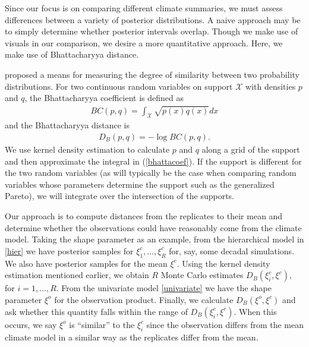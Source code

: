 Since our focus is on comparing different climate summaries, we must assess differences between a variety of posterior distributions. A naive approach may be to simply determine whether posterior intervals overlap. Though we make use of visuals in our comparison, we desire a more quantitative approach. Here, we make use of Bhattacharyya distance.

\cite{bhattacharyya1943measure} proposed a means for measuring the degree of similarity between two probability distributions. For two continuous random variables on support $\mathcal{X}$ with densities $p$ and $q$, the Bhattacharyya coefficient is defined as
\begin{align}
BC(p,q)=\int_\mathcal{X} \sqrt{p(x)q(x)} dx \label{bhattacoef}
\end{align}
and the Bhattacharyya distance is 
\begin{align}
D_B(p,q)=-\log BC(p,q).
\end{align}
We use kernel density estimation to calculate $p$ and $q$ along a grid of the support and then approximate the integral in (\ref{bhattacoef}). If the support is different for the two random variables (as will typically be the case when comparing random variables whose parameters determine the support such as the generalized Pareto), we will integrate over the intersection of the supports.

Our approach is to compute distances from the replicates to their mean and determine whether the observations could have reasonably come from the climate model. Taking the shape parameter as an example, from the hierarchical model in \ref{hier} we have posterior samples for $\xi_1^c,\ldots,\xi_R^c$ for, say, some decadal simulations. We also have posterior samples for the mean $\xi^c$. Using the kernel density estimation mentioned earlier, we obtain $R$ Monte Carlo estimates $D_B(\xi_i^c, \xi^c)$, for $i=1,\ldots,R$. From the univariate model \ref{univariate} we have the shape parameter $\xi^o$ for the observation product. Finally, we calculate $D_B(\xi^o, \xi^c)$ and ask whether this quantity falls within the range of $D_B(\xi_i^c, \xi^c)$. When this occurs, we say $\xi^o$ is ``similar'' to the $\xi_i^c$ since the observation differs from the mean climate model in a similar way as the replicates differ from the mean.
